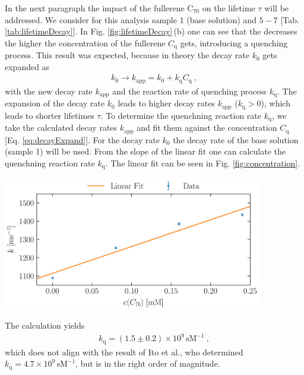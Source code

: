 In the next paragraph the impact of the fullerene $\mathrm{C}_{70}$ on the lifetime $\tau$ will be addressed. We consider for this analysis sample 1 (base solution) and $5-7$ [Tab. \ref{tab:lifetimeDecay}]. In Fig. \ref{fig:lifetimeDecay}\,(b) one can see that the decreases the higher the concentration of the fullerene $C_\mathrm{q}$ gets, introducing a quenching process. This result was expected, because in theory the decay rate $k_0$ gets expanded as
\begin{gather}
    k_0 \longrightarrow k_\mathrm{app} = k_0 + k_\mathrm{q}C_\mathrm{q}~,
    \label{eq:decayExpand}
\end{gather}
with the new decay rate $k_\mathrm{app}$ and the reaction rate of quenching process $k_\mathrm{q}$. The expansion of the decay rate $k_0$ leads to higher decay rates $k_\mathrm{app}$ ($k_\mathrm{q} > 0$), which leads to shorter lifetimes $\tau$. To determine the quenchning reaction rate $k_\mathrm{q}$, we take the calculated decay rates $k_\mathrm{app}$ and fit them against the concentration $C_\mathrm{q}$ [Eq. \ref{eq:decayExpand}]. For the decay rate $k_0$ the decay rate of the base solution (sample 1) will be used. From the slope of the linear fit one can calculate the quenchning reaction rate $k_\mathrm{q}$. The linear fit can be seen in Fig. \ref{fig:concentration}. 

\begin{center}
    \captionsetup{type = figure}
    \includegraphics[width = 0.85\textwidth]{Pictures/Evaluation/42/Concentration.pdf}
    \label{fig:concentration}
\end{center}

The calculation yields
\begin{gather*}
    \boxed{k_\mathrm{q} = (1.5 \pm 0.2) \times 10^9\,\mathrm{sM^{-1}}}~, %
\end{gather*}
which does not align with the result of Ito et al., who determined $k_\mathrm{q} = 4.7 \times 10^9\,\mathrm{sM^{-1}}$\cite{Nojiri.1998}, but is in the right order of magnitude.

